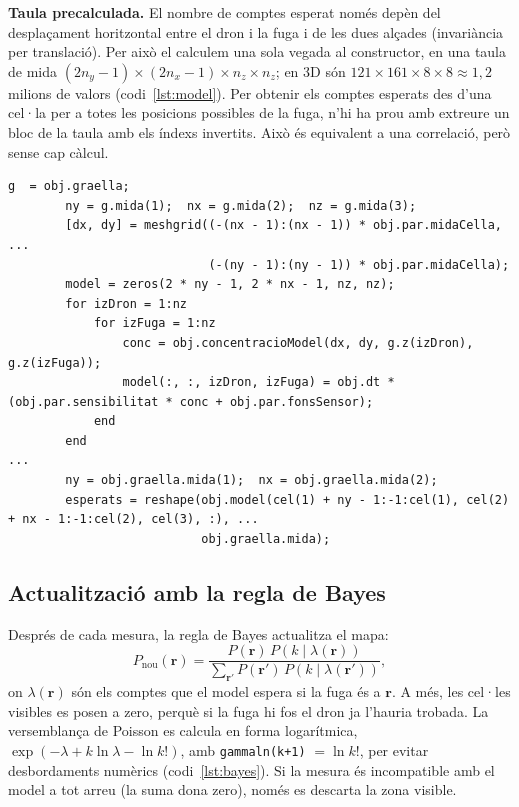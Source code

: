 \documentclass[11pt,a4paper]{article}
\begin{document}
\textbf{Taula precalculada.} El nombre de comptes esperat només depèn del desplaçament horitzontal entre el dron i la fuga i de les dues alçades (invariància per translació). Per això el calculem una sola vegada al constructor, en una taula de mida $(2n_y-1) \times (2n_x-1) \times n_z \times n_z$; en 3D són $121 \times 161 \times 8 \times 8 \approx 1{,}2$ milions de valors (codi~\ref{lst:model}). Per obtenir els comptes esperats des d'una cel·la per a totes les posicions possibles de la fuga, n'hi ha prou amb extreure un bloc de la taula amb els índexs invertits. Això és equivalent a una correlació, però sense cap càlcul.

\begin{lstlisting}[caption={Construcció de la taula del model (\texttt{crearModel}) i extracció dels comptes esperats (\texttt{comptesEsperats}).}, label=lst:model]
        g  = obj.graella;
        ny = g.mida(1);  nx = g.mida(2);  nz = g.mida(3);
        [dx, dy] = meshgrid((-(nx - 1):(nx - 1)) * obj.par.midaCella, ...
                            (-(ny - 1):(ny - 1)) * obj.par.midaCella);
        model = zeros(2 * ny - 1, 2 * nx - 1, nz, nz);
        for izDron = 1:nz
            for izFuga = 1:nz
                conc = obj.concentracioModel(dx, dy, g.z(izDron), g.z(izFuga));
                model(:, :, izDron, izFuga) = obj.dt * (obj.par.sensibilitat * conc + obj.par.fonsSensor);
            end
        end
...
        ny = obj.graella.mida(1);  nx = obj.graella.mida(2);
        esperats = reshape(obj.model(cel(1) + ny - 1:-1:cel(1), cel(2) + nx - 1:-1:cel(2), cel(3), :), ...
                           obj.graella.mida);
\end{lstlisting}

\subsection{Actualització amb la regla de Bayes}

Després de cada mesura, la regla de Bayes actualitza el mapa:
\begin{equation}
P_{\text{nou}}(\mathbf{r}) = \frac{P(\mathbf{r})\, P(k \mid \lambda(\mathbf{r}))}{\sum_{\mathbf{r}'} P(\mathbf{r}')\, P(k \mid \lambda(\mathbf{r}'))},
\end{equation}
on $\lambda(\mathbf{r})$ són els comptes que el model espera si la fuga és a $\mathbf{r}$. A més, les cel·les visibles es posen a zero, perquè si la fuga hi fos el dron ja l'hauria trobada. La versemblança de Poisson es calcula en forma logarítmica, $\exp(-\lambda + k\ln\lambda - \ln k!)$, amb \texttt{gammaln(k+1)} $= \ln k!$, per evitar desbordaments numèrics (codi~\ref{lst:bayes}). Si la mesura és incompatible amb el model a tot arreu (la suma dona zero), només es descarta la zona visible.
\end{document}
